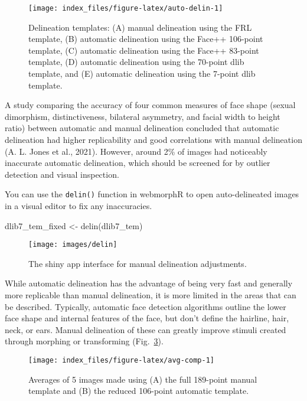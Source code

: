 \documentclass[
  doc,floatsintext]{apa6}
\newenvironment{Shaded}{\begin{snugshade}}{\end{snugshade}}
\newcommand{\FunctionTok}[1]{\textcolor[rgb]{0.00,0.00,0.00}{#1}}
\newcommand{\NormalTok}[1]{#1}
\newcommand{\OtherTok}[1]{\textcolor[rgb]{0.56,0.35,0.01}{#1}}
\begin{document}
\begin{figure}
\texttt{[image: index\_files/figure-latex/auto-delin-1]} \caption{Delineation templates: (A) manual delineation using the FRL template, (B) automatic delineation using the Face++ 106-point template, (C) automatic delineation using the Face++ 83-point template, (D) automatic delineation using the 70-point dlib template, and (E) automatic delineation using the 7-point dlib template.}\label{fig:auto-delin}
\end{figure}

A study comparing the accuracy of four common measures of face shape (sexual dimorphism, distinctiveness, bilateral asymmetry, and facial width to height ratio) between automatic and manual delineation concluded that automatic delineation had higher replicability and good correlations with manual delineation (A. L. Jones et al., 2021). However, around 2\% of images had noticeably inaccurate automatic delineation, which should be screened for by outlier detection and visual inspection.

You can use the \texttt{delin()} function in webmorphR to open auto-delineated images in a visual editor to fix any inaccuracies.

\begin{Shaded}
\begin{Highlighting}[]
\NormalTok{dlib7\_tem\_fixed }\OtherTok{\textless{}{-}} \FunctionTok{delin}\NormalTok{(dlib7\_tem)}
\end{Highlighting}
\end{Shaded}

\begin{figure}
\texttt{[image: images/delin]} \caption{The shiny app interface for manual delineation adjustments.}\label{fig:delin-shiny}
\end{figure}

While automatic delineation has the advantage of being very fast and generally more replicable than manual delineation, it is more limited in the areas that can be described. Typically, automatic face detection algorithms outline the lower face shape and internal features of the face, but don't define the hairline, hair, neck, or ears. Manual delineation of these can greatly improve stimuli created through morphing or transforming (Fig.~\ref{fig:avg-comp}).

\begin{figure}
\texttt{[image: index\_files/figure-latex/avg-comp-1]} \caption{Averages of 5 images made using (A) the full 189-point manual template and (B) the reduced 106-point automatic template.}\label{fig:avg-comp}
\end{figure}
\end{document}
